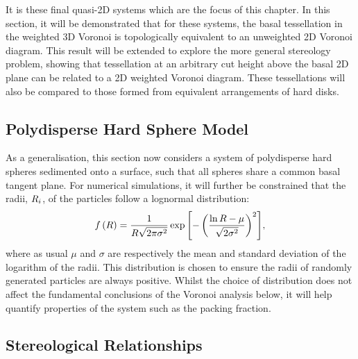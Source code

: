 It is these final quasi\--2D systems which are the focus of this chapter.
In this section, it will be demonstrated that for these systems, the basal tessellation in the weighted 3D Voronoi is topologically equivalent to an unweighted 2D Voronoi diagram.
This result will be extended to explore the more general stereology problem, showing that tessellation at an arbitrary cut height above the basal 2D plane can be related to a 2D weighted Voronoi diagram.
These tessellations will also be compared to those formed from equivalent arrangements of hard disks.

\subsection{Polydisperse Hard Sphere Model}

As a generalisation, this section now considers a system of polydisperse hard spheres sedimented onto a surface, such that all spheres share a common basal tangent plane.
For numerical simulations, it will further be constrained that the radii, $R_i$, of the particles follow a lognormal distribution:
\begin{equation}
	\label{eq:lognormal}
	f\left(R\right)=\frac{1}{R\sqrt{2\pi\sigma^2}}\exp{\left[-\left(\frac{\ln{R}-\mu}{\sqrt{2\sigma^2}}\right)^2\right]},
\end{equation}
where as usual $\mu$ and $\sigma$ are respectively the mean and standard deviation of the logarithm of the radii.
This distribution is chosen to ensure the radii of randomly generated particles are always positive.
Whilst the choice of distribution does not affect the fundamental conclusions of the Voronoi analysis below, it will help quantify properties of the system such as the packing fraction.

\subsection{Stereological Relationships}
\label{sec:vorrel}

